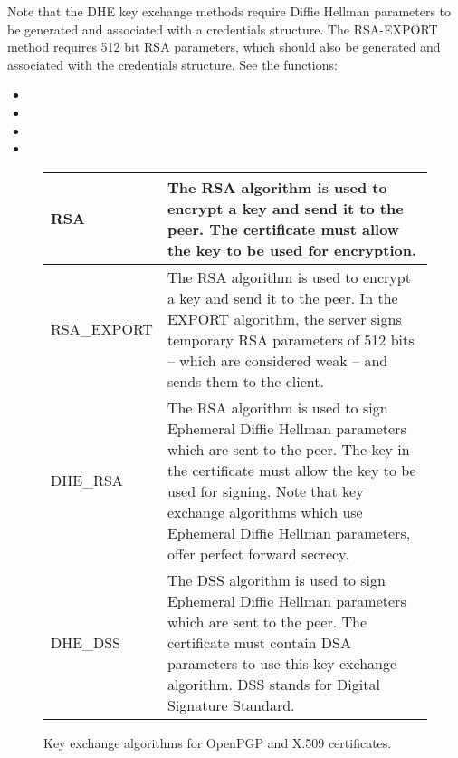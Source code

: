 Note that the DHE key exchange methods require Diffie Hellman parameters
to be generated and associated with a credentials structure. The RSA-EXPORT
method requires 512 bit RSA parameters, which should also be generated
and associated with the credentials structure. See the functions:
\begin{itemize}
\item {}
\item {}
\item {}
\item {}
\end{itemize}


\begin{figure}[hbtp]
\begin{tabular}{|l|p{9cm}|}
\hline
RSA & The RSA algorithm is used to encrypt a key and send it to the peer.
The certificate must allow the key to be used for encryption.
\\
\hline
RSA\_EXPORT & The RSA algorithm is used to encrypt a key and send it to the peer.
In the EXPORT algorithm, the server signs temporary RSA parameters of 512
bits -- which are considered weak -- and sends them to the client.
\\
\hline
DHE\_RSA & The RSA algorithm is used to sign Ephemeral Diffie Hellman
parameters which are sent to the peer. The key in the certificate must allow
the key to be used for signing. Note that key exchange algorithms which use
Ephemeral Diffie Hellman parameters, offer perfect forward secrecy.
\\
\hline
DHE\_DSS & The DSS algorithm is used to sign Ephemeral Diffie Hellman
parameters which are sent to the peer. The certificate must contain DSA
parameters to use this key exchange algorithm. DSS stands for Digital Signature
Standard.
\\
\hline
\end{tabular}

\caption{Key exchange algorithms for OpenPGP and X.509 certificates.}
\label{fig:cert}

\end{figure}


